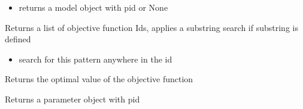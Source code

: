 \documentclass[letterpaper,10pt,english]{sphinxmanual}
\begin{document}
\begin{fulllineitems}
\begin{fulllineitems}
\label{\detokenize{modules_doc:cbmpy.CBModel.Model.getObject}}
\pysigstartsignatures
{}
\pysigstopsignatures\begin{itemize}
\item {} 
\sphinxAtStartPar
{} returns a model object with pid or None

\end{itemize}

\end{fulllineitems}


\begin{fulllineitems}
\label{\detokenize{modules_doc:cbmpy.CBModel.Model.getObjectiveIds}}
\pysigstartsignatures
{}
\pysigstopsignatures
\sphinxAtStartPar
Returns a list of objective function Ids, applies a substring search if substring is defined
\begin{itemize}
\item {} 
\sphinxAtStartPar
{} search for this pattern anywhere in the id

\end{itemize}

\end{fulllineitems}


\begin{fulllineitems}
\label{\detokenize{modules_doc:cbmpy.CBModel.Model.getOptimalValue}}
\pysigstartsignatures
{}
\pysigstopsignatures
\sphinxAtStartPar
Returns the optimal value of the objective function

\end{fulllineitems}


\begin{fulllineitems}
\label{\detokenize{modules_doc:cbmpy.CBModel.Model.getParameter}}
\pysigstartsignatures
{}
\pysigstopsignatures
\sphinxAtStartPar
Returns a parameter object with pid


\end{fulllineitems}
\end{fulllineitems}
\end{document}
